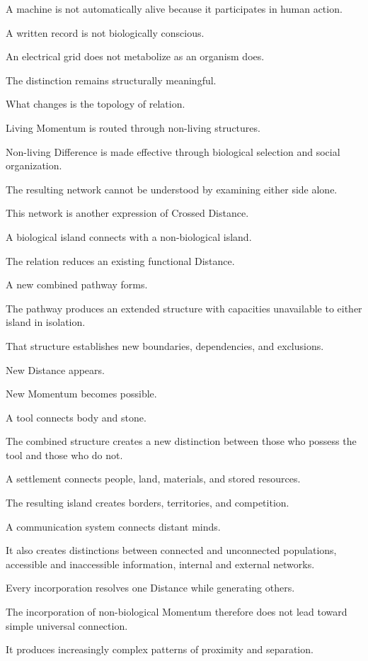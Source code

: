 A machine is not automatically alive because it participates in human action.

A written record is not biologically conscious.

An electrical grid does not metabolize as an organism does.

The distinction remains structurally meaningful.

What changes is the topology of relation.

Living Momentum is routed through non-living structures.

Non-living Difference is made effective through biological selection and social organization.

The resulting network cannot be understood by examining either side alone.

This network is another expression of Crossed Distance.

A biological island connects with a non-biological island.

The relation reduces an existing functional Distance.

A new combined pathway forms.

The pathway produces an extended structure with capacities unavailable to either island in isolation.

That structure establishes new boundaries, dependencies, and exclusions.

New Distance appears.

New Momentum becomes possible.

A tool connects body and stone.

The combined structure creates a new distinction between those who possess the tool and those who do not.

A settlement connects people, land, materials, and stored resources.

The resulting island creates borders, territories, and competition.

A communication system connects distant minds.

It also creates distinctions between connected and unconnected populations, accessible and inaccessible information, internal and external networks.

Every incorporation resolves one Distance while generating others.

The incorporation of non-biological Momentum therefore does not lead toward simple universal connection.

It produces increasingly complex patterns of proximity and separation.

